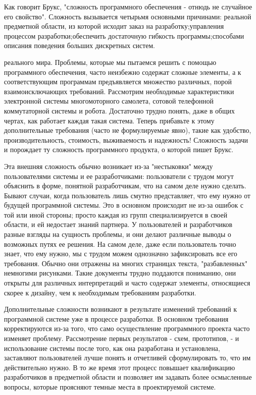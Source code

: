 \documentclass[11pt]{article}
\begin{document}
Как говорит Брукс, "сложность программного обеспечения - отнюдь не случайное его свойство". Сложность вызывается четырьмя основными причинами: 
{\itemize
{} реальной предметной области, из которой исходит заказ на разработку; управления процессом разработки; обеспечить достаточную гибкость программы; способами описания поведения больших дискретных систем.}
\parskip=2mm
\par
{ реального мира.} Проблемы, которые мы пытаемся решить с помощью программного обеспечения, часто неизбежно содержат сложные элементы, а к соответствующим программам предъявляется множество различных, порой взаимоисключающих требований. Рассмотрим необходимые характеристики электронной системы многомоторного самолета, сотовой телефонной коммутаторной системы и робота. Достаточно трудно понять, даже в общих чертах, как работает каждая такая система. Теперь прибавьте к этому дополнительные требования (часто не формулируемые явно), такие как удобство, производительность, стоимость, выживаемость и надежность! Сложность задачи и порождает ту сложность программного продукта, о которой пишет Брукс.
\par
Эта внешняя сложность обычно возникает из-за "нестыковки" между пользователями системы и ее разработчиками: пользователи с трудом могут объяснить в форме, понятной разработчикам, что на самом деле нужно сделать. Бывают случаи, когда пользователь лишь смутно представляет, что ему нужно от будущей программной системы. Это в основном происходит не из-за ошибок с той или иной стороны; просто каждая из групп специализируется в своей области, и ей недостает знаний партнера. У пользователей и разработчиков разные взгляды на сущность проблемы, и они делают различные выводы о возможных путях ее решения. На самом деле, даже если пользователь точно знает, что ему нужно, мы с трудом можем однозначно зафиксировать все его требования. Обычно они отражены на многих страницах текста, "разбавленных" немногими рисунками. Такие документы трудно поддаются пониманию, они открыты для различных интерпретаций и часто содержат элементы, относящиеся скорее к дизайну, чем к необходимым требованиям разработки.
\par
Дополнительные сложности возникают в результате изменений требований к программной системе уже в процессе разработки. В основном требования корректируются из-за того, что само осуществление программного проекта часто изменяет проблему. Рассмотрение первых результатов - схем, прототипов, - и использование системы после того, как она разработана и установлена, заставляют пользователей лучше понять и отчетливей сформулировать то, что им действительно нужно. В то же время этот процесс повышает квалификацию разработчиков в предметной области и позволяет им задавать более осмысленные вопросы, которые проясняют темные места в проектируемой системе. 
\end{document}
